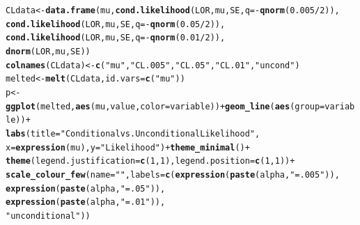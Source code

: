\documentclass[AMA,STIX1COL]{WileyNJD-v2}\usepackage[]{graphicx}\usepackage[]{color}
\makeatletter
\newcommand{\hlnum}[1]{\textcolor[rgb]{0.686,0.059,0.569}{#1}}%
\newcommand{\hlstr}[1]{\textcolor[rgb]{0.192,0.494,0.8}{#1}}%
\newcommand{\hlopt}[1]{\textcolor[rgb]{0,0,0}{#1}}%
\newcommand{\hlstd}[1]{\textcolor[rgb]{0.345,0.345,0.345}{#1}}%
\newcommand{\hlkwb}[1]{\textcolor[rgb]{0.69,0.353,0.396}{#1}}%
\newcommand{\hlkwc}[1]{\textcolor[rgb]{0.333,0.667,0.333}{#1}}%
\newcommand{\hlkwd}[1]{\textcolor[rgb]{0.737,0.353,0.396}{\textbf{#1}}}%
\newenvironment{kframe}{%
 \def\at@end@of@kframe{}%
 \ifinner\ifhmode%
  \def\at@end@of@kframe{\end{minipage}}%
  \begin{minipage}{\columnwidth}%
 \fi\fi%
 \def\FrameCommand##1{\hskip\@totalleftmargin \hskip-\fboxsep
 \colorbox{shadecolor}{##1}\hskip-\fboxsep
     \hskip-\linewidth \hskip-\@totalleftmargin \hskip\columnwidth}%
 \MakeFramed {\advance\hsize-\width
   \@totalleftmargin\z@ \linewidth\hsize
   \@setminipage}}%
 {\par\unskip\endMakeFramed%
 \at@end@of@kframe}
\newenvironment{knitrout}{}{} %
\makeatother
\begin{document}
\begin{knitrout}
\color{fgcolor}\begin{kframe}
\begin{alltt}
\hlstd{CLdata}\hlkwb{<-}\hlkwd{data.frame}\hlstd{(mu,} \hlkwd{cond.likelihood}\hlstd{(LOR, mu, SE,} \hlkwc{q} \hlstd{=} \hlopt{-}\hlkwd{qnorm}\hlstd{(}\hlnum{0.005}\hlopt{/}\hlnum{2}\hlstd{)),}
                   \hlkwd{cond.likelihood}\hlstd{(LOR, mu, SE,} \hlkwc{q} \hlstd{=} \hlopt{-}\hlkwd{qnorm}\hlstd{(}\hlnum{0.05}\hlopt{/}\hlnum{2}\hlstd{)),}
                   \hlkwd{cond.likelihood}\hlstd{(LOR, mu, SE,} \hlkwc{q} \hlstd{=} \hlopt{-}\hlkwd{qnorm}\hlstd{(}\hlnum{0.01}\hlopt{/}\hlnum{2}\hlstd{)),}
                   \hlkwd{dnorm}\hlstd{(LOR, mu, SE))}
\hlkwd{colnames}\hlstd{(CLdata)}\hlkwb{<-} \hlkwd{c}\hlstd{(}\hlstr{"mu"}\hlstd{,} \hlstr{"CL.005"}\hlstd{,}\hlstr{"CL.05"}\hlstd{,}\hlstr{"CL.01"}\hlstd{,}\hlstr{"uncond"}\hlstd{)}
\hlstd{melted} \hlkwb{<-} \hlkwd{melt}\hlstd{(CLdata,} \hlkwc{id.vars}\hlstd{=}\hlkwd{c}\hlstd{(}\hlstr{"mu"}\hlstd{))}
\hlstd{p}\hlkwb{<-} \hlkwd{ggplot}\hlstd{(melted,} \hlkwd{aes}\hlstd{(mu, value,} \hlkwc{color} \hlstd{= variable))} \hlopt{+} \hlkwd{geom_line}\hlstd{(}\hlkwd{aes}\hlstd{(}\hlkwc{group}\hlstd{=variable))} \hlopt{+}
  \hlkwd{labs}\hlstd{(}\hlkwc{title} \hlstd{=} \hlstr{"Conditional vs. Unconditional Likelihood"}\hlstd{,}
       \hlkwc{x} \hlstd{=} \hlkwd{expression}\hlstd{(mu),} \hlkwc{y} \hlstd{=} \hlstr{"Likelihood"}\hlstd{)}\hlopt{+}  \hlkwd{theme_minimal}\hlstd{()}\hlopt{+}
  \hlkwd{theme}\hlstd{(}\hlkwc{legend.justification}\hlstd{=}\hlkwd{c}\hlstd{(}\hlnum{1}\hlstd{,}\hlnum{1}\hlstd{),} \hlkwc{legend.position}\hlstd{=}\hlkwd{c}\hlstd{(}\hlnum{1}\hlstd{,}\hlnum{1}\hlstd{))} \hlopt{+}
  \hlkwd{scale_colour_few}\hlstd{(}\hlkwc{name}\hlstd{=}\hlstr{""}\hlstd{,} \hlkwc{labels}\hlstd{=}\hlkwd{c}\hlstd{(}\hlkwd{expression}\hlstd{(}\hlkwd{paste}\hlstd{(alpha,}\hlstr{" = .005"}\hlstd{)),}
                                     \hlkwd{expression}\hlstd{(}\hlkwd{paste}\hlstd{(alpha,}\hlstr{" = .05"}\hlstd{)),}
                                     \hlkwd{expression}\hlstd{(}\hlkwd{paste}\hlstd{(alpha,}\hlstr{" = .01"}\hlstd{)),}
                                     \hlstr{"unconditional"}\hlstd{))}
\end{alltt}
\end{kframe}
\end{knitrout}
\end{document}
